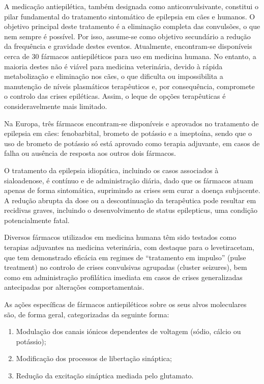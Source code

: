 A medicação antiepilética, também designada como anticonvulsivante, constitui o pilar fundamental do tratamento sintomático de epilepsia em cães e humanos. O objetivo principal deste tratamento é a eliminação completa das convulsões, o que nem sempre é possível. Por isso, assume-se como objetivo secundário a redução da frequência e gravidade destes eventos.\cite{Animalmodel}
Atualmente, encontram-se disponíveis cerca de 30 fármacos antiepiléticos para uso em medicina humana. No entanto, a maioria destes não é viável para medicina veterinária, devido à rápida metabolização e eliminação nos cães, o que dificulta ou impossibilita a manutenção de níveis plasmáticos terapêuticos e, por consequência, compromete o controlo das crises epiléticas. \cite{Animalmodel} Assim, o leque de opções terapêuticas é consideravelmente mais limitado. \cite{Animalmodel}


Na Europa, três fármacos encontram-se disponíveis e aprovados no tratamento de epilepsia em cães: fenobarbital, brometo de potássio e a imeptoína, sendo que o uso de brometo de potássio só está aprovado como terapia adjuvante, em casos de falha ou ausência de resposta aos outros dois fármacos. \cite{Royaux2017}


O tratamento da epilepsia idiopática, incluindo os casos associados à sialoadenose, é contínuo e de administração diária, dado que os fármacos atuam apenas de forma sintomática, suprimindo as crises sem curar a doença subjacente. A redução abrupta da dose ou a descontinuação da terapêutica pode resultar em recidivas graves, incluindo o desenvolvimento de status epilepticus, uma condição potencialmente fatal. 


Diversos fármacos utilizados em medicina humana têm sido testados como terapias adjuvantes na medicina veterinária, com destaque para o levetiracetam, que tem demonstrado eficácia em regimes de “tratamento em impulso” (pulse treatment) no controlo de crises convulsivas agrupadas (cluster seizures), bem como em administração profilática imediata em casos de crises generalizadas antecipadas por alterações comportamentais. 


As ações específicas de fármacos antiepiléticos sobre os seus alvos moleculares são, de forma geral, categorizadas da seguinte forma: \cite{katzung}

\begin{enumerate}
    \item	Modulação dos canais iónicos dependentes de voltagem (sódio, cálcio ou potássio);
    \item Modificação dos processos de libertação sináptica;
    \item Redução da excitação sináptica mediada pelo glutamato.
\end{enumerate}


